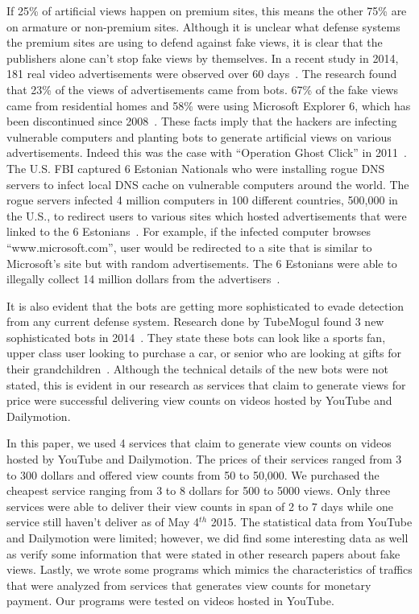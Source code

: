\documentclass[conference]{IEEEtran}
\begin{document}
If 25\% of artificial views happen on premium sites, this means the other 75\% are on armature or non-premium sites. Although it is unclear what defense systems the premium sites are using to defend against fake views, it is clear that the publishers alone can't stop fake views by themselves. In a recent study in 2014, 181 real video advertisements were observed over 60 days~\cite{c19}. The research found that 23\% of the views of advertisements came from bots. 67\% of the fake views came from residential homes and 58\% were using Microsoft Explorer 6, which has been discontinued since 2008~\cite{c19}. These facts imply that the hackers are infecting vulnerable computers and planting bots to generate artificial views on various advertisements. Indeed this was the case with “Operation Ghost Click” in 2011~\cite{c3, c4}. The U.S. FBI captured 6 Estonian Nationals who were installing rogue DNS servers to infect local DNS cache on vulnerable computers around the world. The rogue servers infected 4 million computers in 100 different countries, 500,000 in the U.S., to redirect users to various sites which hosted advertisements that were linked to the 6 Estonians~\cite{c4}. For example, if the infected computer browses “www.microsoft.com”, user would be redirected to a site that is similar to Microsoft’s site but with random advertisements. The 6 Estonians were able to illegally collect 14 million dollars from the advertisers~\cite{c4}.

It is also evident that the bots are getting more sophisticated to evade detection from any current defense system. Research done by TubeMogul found 3 new sophisticated bots in 2014~\cite{c2}. They state these bots can look like a sports fan, upper class user looking to purchase a car, or senior who are looking at gifts for their grandchildren~\cite{c2}. Although the technical details of the new bots were not stated, this is evident in our research as services that claim to generate views for price were successful delivering view counts on videos hosted by YouTube and Dailymotion.

In this paper, we used 4 services that claim to generate view counts on videos hosted by YouTube and Dailymotion. The prices of their services ranged from 3 to 300 dollars and offered view counts from 50 to 50,000. We purchased the cheapest service ranging from 3 to 8 dollars for 500 to 5000 views. Only three services were able to deliver their view counts in span of 2 to 7 days while one service still haven't deliver as of May 4$^{th}$ 2015. The statistical data from YouTube and Dailymotion were limited; however, we did find some interesting data as well as verify some information that were stated in other research papers about fake views. Lastly, we wrote some programs which mimics the characteristics of traffics that were analyzed from services that generates view counts for monetary payment. Our programs were tested on videos hosted in YouTube.
\end{document}
